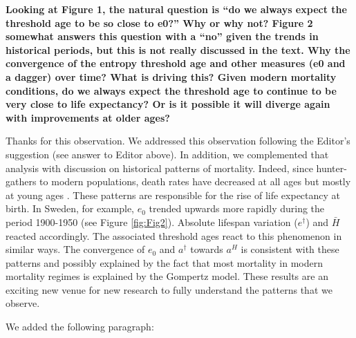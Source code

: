 \documentclass[a4paper,twoside, openright, 12pt, leqno]{article}
\begin{document}
\textbf{Looking at Figure 1, the natural question is “do we always expect the threshold age to be so close to e0?” Why or why not? Figure 2 somewhat answers this question with a “no” given the trends in historical periods, but this is not really discussed in the text. Why the convergence of the entropy threshold age and other measures (e0 and a dagger) over time? What is driving this? Given modern mortality conditions, do we always expect the threshold age to continue to be very close to life expectancy? Or is it possible it will diverge again with improvements at older ages?} 
\linebreak

Thanks for this observation. We addressed this observation following the Editor's suggestion (see answer to Editor above). In addition, we complemented that analysis with discussion on historical patterns of mortality. Indeed, since hunter-gathers to modern populations, death rates have decreased at all ages but mostly at young ages \citep{burger2012human}. These patterns are responsible for the rise of life expectancy at birth. In Sweden,  for example, $e_0$ trended upwards more rapidly during the period 1900-1950 (see Figure \ref{fig:Fig2}). Absolute lifespan variation ($e^\dagger$) and $\bar{H}$ reacted accordingly. The associated threshold ages react to this phenomenon in similar ways. The convergence of $e_0$ and $a^\dagger$ towards $a^H$ is consistent with these patterns and possibly explained by the fact that most mortality in modern mortality regimes is explained by the Gompertz model. These results are an exciting new venue for new research to fully understand the patterns that we observe.
\linebreak

We added the following paragraph:
\linebreak
\end{document}
